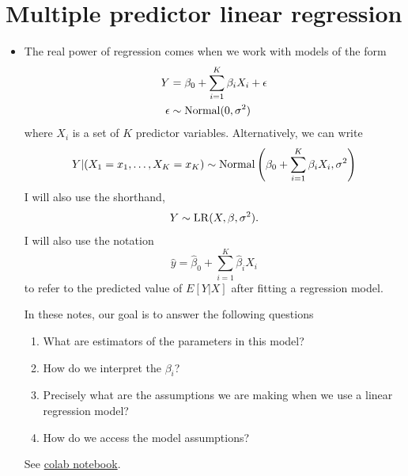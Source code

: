\section{Multiple predictor linear regression}
\begin{itemize}
\item The real power of regression comes when we work with models of the form 
\begin{align}
Y &= \beta_0 + \sum_{i=1}^K \beta_iX_i + \epsilon\\
\epsilon &\sim {\rm Normal}(0,\sigma^2)
\end{align}
where $X_i$ is a set of $K$ predictor variables. Alternatively, we can write
\begin{equation}
Y|(X_1=x_1,\dots,X_K=x_K) \sim {\rm Normal}\left( \beta_0 + \sum_{i=1}^K \beta_iX_i,\sigma^2\right)
\end{equation}
I will also use the shorthand, 
\begin{equation}
Y \sim {\rm LR}(X,\beta,\sigma^2). 
\end{equation}
I will also use the notation 
\begin{equation*}
\hat{y} = \hat{\beta}_0 + \sum_{i=1}^K \hat{\beta}_iX_i 
\end{equation*}
to refer to the predicted value of $E[Y|X]$ after fitting a regression model. 

In these notes, our goal is to answer the following questions
\begin{enumerate}
\item What are estimators of the parameters in this model?
\item How do we interpret the  $\beta_i$? 
\item Precisely what are the assumptions we are making when we use a linear regression model? 
\item How do we access the model assumptions? 
\end{enumerate}



\begin{example}
See \href{https://colab.research.google.com/drive/1oIRgP_7-c5DGV1D2iz5nj406mZfJxUIG?usp=sharing}{colab notebook}. 
\end{example}


\end{itemize}
